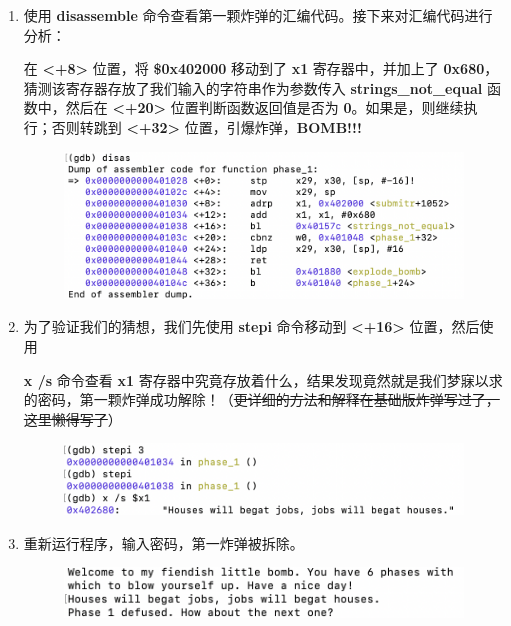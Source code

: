 \begin{enumerate}
\begin{figure}[htbp]
                \end{figure}
            \newpage
            \item 使用 \textbf{disassemble} 命令查看第一颗炸弹的汇编代码。接下来对汇编代码进行分析：
                \par 在 \textbf{<+8>} 位置，将 \textbf{\$0x402000} 移动到了 \textbf{x1} 寄存器中，并加上了 \textbf{0x680}，猜测该寄存器存放了我们输入的字符串作为参数传入 \textbf{strings\_not\_equal} 函数中，然后在 \textbf{<+20>} 位置判断函数返回值是否为 \textbf{0}。如果是，则继续执行；否则转跳到 \textbf{<+32>} 位置，引爆炸弹，\textbf{BOMB!!!}
                \begin{figure}[htbp]
                    \centering
                    \includegraphics*[width = 12cm]{s1_4.png}
                \end{figure}
            \item 为了验证我们的猜想，我们先使用 \textbf{stepi} 命令移动到 \textbf{<+16>} 位置，然后使用 \par \textbf{x /s} 命令查看 \textbf{x1} 寄存器中究竟存放着什么，结果发现竟然就是我们梦寐以求的密码，第一颗炸弹成功解除！（\sout{更详细的方法和解释在基础版炸弹写过了，这里懒得写了}）
                \begin{figure}[htbp]
                    \centering
                    \includegraphics*[width = 12cm]{s1_5.png}
                \end{figure}
            \item 重新运行程序，输入密码，第一炸弹被拆除。
                \begin{figure}[htbp]
                    \centering
                    \includegraphics*[width = 12cm]{s1_6.png}
                \end{figure}
        \end{enumerate}
    \newpage
